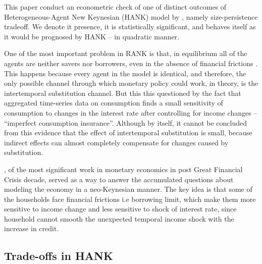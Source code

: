 \documentclass[12pt]{article}
\begin{document}
This paper conduct an econometric check of one of distinct outcomes of Heterogeneous-Agent New Keynesian (HANK) model by \citet[henceforth, KMV]{KMV2018}, namely size-persistence tradeoff. 
We denote  it presence, it is statistically significant, and behaves itself as it would be prognosed by HANK -- in quadratic manner.



One of the most important problem in RANK is that, in equilibrium all of the agents are neither savers nor borrowers, even in the absence of financial frictions \cite{Gali2018}. 
This happens because every agent in the model is identical, and therefore, the only possible channel through which monetary policy could work, in theory, is the intertemporal substitution channel.
But this this questioned by the fact that aggregated time-series data on consumption finds a small sensitivity of consumption to changes in the interest rate after controlling for income changes \cite{Campbell1989, Canzoneri2007} -- ``imperfect consumption insurance''. 
Although by itself, it cannot be concluded from this evidence that the effect of intertemporal substitution is small, because indirect effects can almost completely compensate for changes caused by substitution.


\citet{KMV2018}, of the most significant work in monetary economics in post Great Financial Crisis decade, served as a way to answer the accumulated questions about modeling the economy in a neo-Keynesian manner. 
The key idea is that some of the households face financial frictions i.e borrowing limit, which make them more sensitive to income change and less sensitive to shock of interest rate, since household cannot smooth the unexpected temporal income shock with the increase in credit.




\subsection{Trade-offs in HANK}
\end{document}
